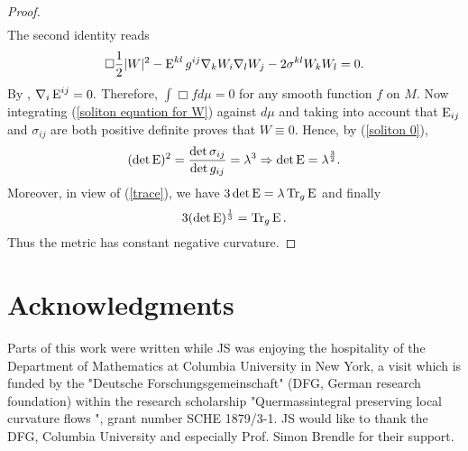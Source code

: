 \documentclass[a4paper,12pt]{amsart}
\begin{document}
\begin{proof}
\begin{align}
\end{align}
The second identity reads
\begin{align}\label{soliton equation for W}
\Box \frac{1}{2}|W|^2-\operatorname{E}^{kl}g^{ij}\nabla_kW_i\nabla_lW_j-2\sigma^{kl}W_kW_l=0.
\end{align}
By \cite[Lemma 1]{MR2055396}, $\nabla_i\operatorname{E}^{ij}=0.$ Therefore, $\int \Box fd\mu=0$ for any smooth function $f$ on $M$.
Now integrating (\ref{soliton equation for W}) against $d\mu$ and taking into account that $\operatorname{E}_{ij}$ and $\sigma_{ij}$ are both positive definite proves that $W\equiv0$. Hence, by (\ref{soliton 0}),
\[(\det\operatorname{E})^2=\frac{\det \sigma_{ij}}{\det g_{ij}}=\lambda ^3\Rightarrow \det\operatorname{E}=\lambda^{\frac{3}{2}}.\]
Moreover, in view of (\ref{trace}), we have $3\det\operatorname{E}=\lambda \operatorname{Tr}_g \operatorname{E}$ and finally \[3(\det\operatorname{E})^{\frac{1}{3}}=\operatorname{Tr}_g \operatorname{E}.\] Thus the metric has constant negative curvature.
\end{proof}





%
%

\section*{Acknowledgments}
Parts of this work were written while JS was enjoying the hospitality of the Department of Mathematics at Columbia University in New York, a visit which is funded by the "Deutsche Forschungsgemeinschaft" (DFG, German research foundation) within the research scholarship "Quermassintegral preserving local curvature flows
", grant number SCHE 1879/3-1. JS would like to thank the DFG, Columbia University and especially Prof. Simon Brendle for their support.


\printbibliography
\end{document}

